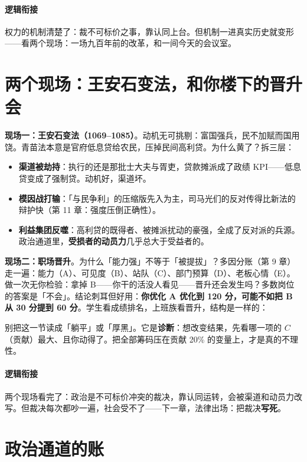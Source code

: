 \documentclass[../../main2.tex]{subfiles}
\begin{document}
\paragraph*{逻辑衔接}
	权力的机制清楚了：裁不可标价之事，靠认同上台。但机制一进真实历史就变形——看两个现场：一场九百年前的改革，和一间今天的会议室。

\section{两个现场：王安石变法，和你楼下的晋升会}

\textbf{现场一：王安石变法（1069–1085）}。动机无可挑剔：富国强兵，民不加赋而国用饶。青苗法本意是官府低息贷给农民，压掉民间高利贷。为什么黄了？拆三层：

\begin{itemize}
	\item \textbf{渠道被劫持}：执行的还是那批士大夫与胥吏，贷款摊派成了政绩 KPI——低息贷变成了强制贷。动机好，渠道坏。
	\item \textbf{模因战打输}：「与民争利」的压缩版先入为主，司马光们的反对传得比新法的辩护快（第 11 章：强度压倒正确性）。
	\item \textbf{利益集团反噬}：高利贷的既得者、被摊派扰动的豪强，全成了反对派的兵源。政治通道里，\textbf{受损者的动员力}几乎总大于受益者的。
\end{itemize}

\textbf{现场二：职场晋升}。为什么「能力强」不等于「被提拔」？多因分账（第 9 章）走一遍：能力（A）、可见度（B）、站队（C）、部门预算（D）、老板心情（E）。做一次无你检验：拿掉 B——你干的活没人看见——晋升还会发生吗？多数岗位的答案是「不会」。结论刺耳但好用：\textbf{你优化 A 优化到 120 分，可能不如把 B 从 30 分提到 60 分}。学生看成绩排名，上班族看晋升，结构是一样的：

\begin{warningbox}
	别把这一节读成「躺平」或「厚黑」。它是\textbf{诊断}：想改变结果，先看哪一项的 $C$（贡献）最大、且你动得了。把全部筹码压在贡献 20\% 的变量上，才是真的不理性。
\end{warningbox}

\paragraph*{逻辑衔接}
	两个现场看完了：政治是不可标价冲突的裁决，靠认同运转，会被渠道和动员力改写。但裁决每次都吵一遍，社会受不了——下一章，法律出场：把裁决\textbf{写死}。

\section{政治通道的账}
\end{document}
